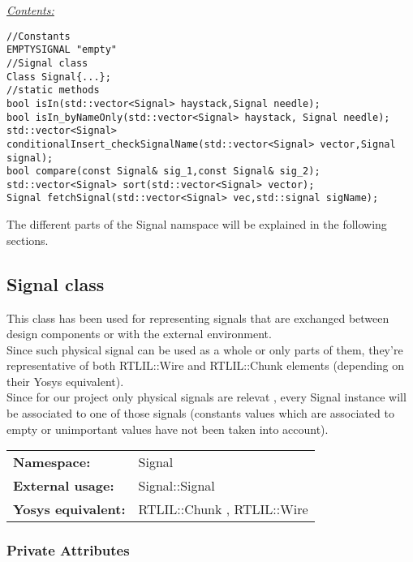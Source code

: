 \documentclass{article}
\begin{document}
\underline{\textit{\underline{Contents: }}}\\

\begin{mdframed}[hidealllines=true, backgroundcolor=green!10]
	\begin{lstlisting}
//Constants
EMPTYSIGNAL "empty"
//Signal class
Class Signal{...};
//static methods
bool isIn(std::vector<Signal> haystack,Signal needle);
bool isIn_byNameOnly(std::vector<Signal> haystack, Signal needle);
std::vector<Signal> conditionalInsert_checkSignalName(std::vector<Signal> vector,Signal signal);
bool compare(const Signal& sig_1,const Signal& sig_2);
std::vector<Signal> sort(std::vector<Signal> vector);
Signal fetchSignal(std::vector<Signal> vec,std::signal sigName);
	\end{lstlisting}
\end{mdframed}

The different parts of the Signal namspace will be explained in the following sections.\\

\subsection{Signal class}

This class has been used for representing signals that are exchanged between design components or with the external environment.\\
Since such physical signal can be used as a whole or only parts of them, they're representative of both RTLIL::Wire and RTLIL::Chunk elements 
(depending on their Yosys equivalent).\\
Since for our project only physical signals are relevat , every Signal instance will be associated to one of those signals (constants values which are associated to empty or unimportant values have not been taken into account).\\

\begin{tabular}{ll}
	\textbf{Namespace: } & Signal\\
	\textbf{External usage: } & Signal::Signal\\
	\textbf{Yosys equivalent: } & RTLIL::Chunk , RTLIL::Wire\\
\end{tabular}

\subsubsection{Private Attributes}
\end{document}
